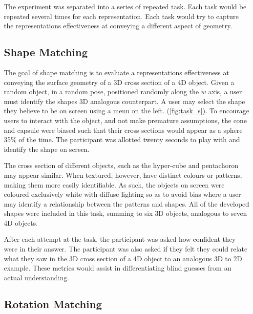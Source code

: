 \documentclass{l4proj}
\begin{document}
The experiment was separated into a series of repeated task. Each task would be repeated several times for each representation. Each task would try to capture the representations effectiveness at conveying a different aspect of geometry.

\subsection{Shape Matching}

The goal of shape matching is to evaluate a representations effectiveness at conveying the surface geometry of a 3D cross section of a 4D object.
Given a random object, in a random pose, positioned randomly along the $w$ axis, a user must identify the shapes 3D analogous counterpart. A user may select the shape they believe to be on screen using a menu on the left.
(\cref{fig:task_s}).
To encourage users to interact with the object, and not make premature assumptions, the cone and capsule were biased such that their cross sections would appear as a sphere 35\% of the time.
The participant was allotted twenty seconds to play with and identify the shape on screen.

The cross section of different objects, such as the hyper-cube and pentachoron may appear similar. When textured, however, have distinct colours or patterns, making them more easily identifiable. As such, the objects on screen were coloured exclusively white with diffuse lighting so as to avoid bias where a user may identify a relationship between the patterns and shapes. 
All of the developed shapes were included in this task, summing to six 3D objects, analogous to seven 4D objects.

After each attempt at the task, the participant was asked how confident they were in their answer. The participant was also asked if they felt they could relate what they saw in the 3D cross section of a 4D object to an analogous 3D to 2D example. These metrics would assist in differentiating blind guesses from an actual understanding.

\subsection{Rotation Matching}
\end{document}
